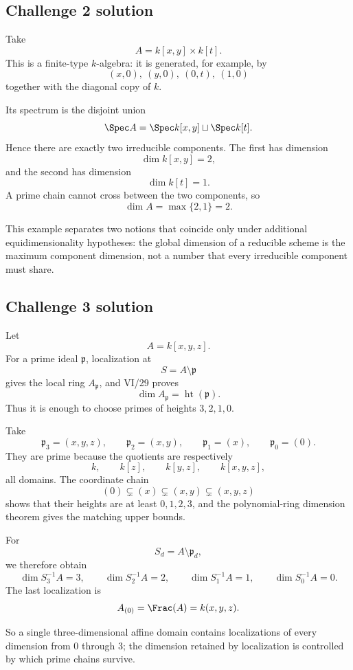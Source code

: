 \subsection*{Challenge 2 solution}
\begin{solution}
Take
\[
A=k[x,y]\times k[t].
\]
This is a finite-type \(k\)-algebra: it is generated, for example, by
\[
(x,0),\ (y,0),\ (0,t),\ (1,0)
\]
together with the diagonal copy of \(k\).

Its spectrum is the disjoint union
\[
\Spec A
=
\Spec k[x,y]\sqcup\Spec k[t].
\]
Hence there are exactly two irreducible components.  The first has dimension
\[
\dim k[x,y]=2,
\]
and the second has dimension
\[
\dim k[t]=1.
\]
A prime chain cannot cross between the two components, so
\[
\dim A
=
\max\{2,1\}
=
\boxed{2}.
\]

This example separates two notions that coincide only under additional equidimensionality
hypotheses: the global dimension of a reducible scheme is the maximum component dimension, not a
number that every irreducible component must share.
\end{solution}

\subsection*{Challenge 3 solution}
\begin{solution}
Let
\[
A=k[x,y,z].
\]
For a prime ideal \(\mathfrak p\), localization at
\[
S=A\setminus\mathfrak p
\]
gives the local ring \(A_{\mathfrak p}\), and VI/29 proves
\[
\dim A_{\mathfrak p}=\operatorname{ht}(\mathfrak p).
\]
Thus it is enough to choose primes of heights \(3,2,1,0\).

Take
\[
\mathfrak p_3=(x,y,z),\qquad
\mathfrak p_2=(x,y),\qquad
\mathfrak p_1=(x),\qquad
\mathfrak p_0=(0).
\]
They are prime because the quotients are respectively
\[
k,\qquad k[z],\qquad k[y,z],\qquad k[x,y,z],
\]
all domains.  The coordinate chain
\[
(0)\subsetneq(x)\subsetneq(x,y)\subsetneq(x,y,z)
\]
shows that their heights are at least \(0,1,2,3\), and the polynomial-ring dimension theorem gives
the matching upper bounds.

For
\[
S_d=A\setminus\mathfrak p_d,
\]
we therefore obtain
\[
\dim S_3^{-1}A=3,\qquad
\dim S_2^{-1}A=2,\qquad
\dim S_1^{-1}A=1,\qquad
\dim S_0^{-1}A=0.
\]
The last localization is
\[
A_{(0)}=\Frac(A)=k(x,y,z).
\]

So a single three-dimensional affine domain contains localizations of every dimension from \(0\)
through \(3\); the dimension retained by localization is controlled by which prime chains survive.
\end{solution}


